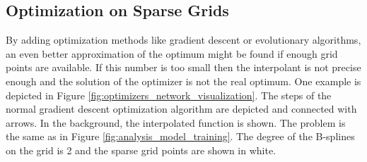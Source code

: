 \subsection{Optimization on Sparse Grids}

By adding optimization methods like gradient descent or evolutionary algorithms, an even better approximation of the optimum might be found if enough grid points are available. If this number is too small then the interpolant is not precise enough and the solution of the optimizer is not the real optimum. One example is depicted in Figure \ref{fig:optimizers_network_visualization}. The steps of the normal gradient descent optimization algorithm are depicted and connected with arrows. In the background, the interpolated function is shown. The problem is the same as in Figure \ref{fig:analysis_model_training}. The degree of the B-splines on the grid is 2 and the sparse grid points are shown in white. 

